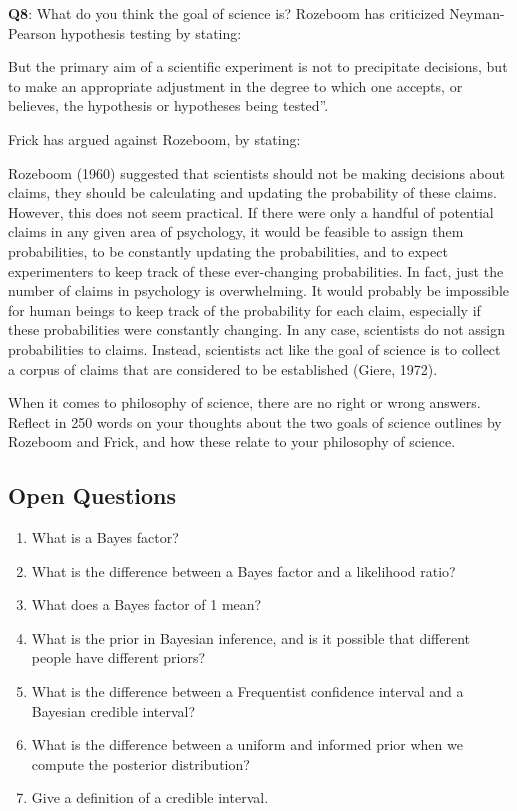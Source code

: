 \documentclass[
  oneside]{krantz}
\renewenvironment{quote}{\begin{VF}}{\end{VF}}
\begin{document}
\textbf{Q8}: What do you think the goal of science is? Rozeboom \citeyearpar{rozeboom_fallacy_1960} has criticized Neyman-Pearson hypothesis testing by stating:

\begin{quote}
But the primary aim of a scientific experiment is not to precipitate decisions, but to make an appropriate adjustment in the degree to which one accepts, or believes, the hypothesis or hypotheses being tested''.
\end{quote}

Frick \citeyearpar{frick_appropriate_1996} has argued against Rozeboom, by stating:

\begin{quote}
Rozeboom (1960) suggested that scientists should not be making decisions about claims, they should be calculating and updating the probability of these claims. However, this does not seem practical. If there were only a handful of potential claims in any given area of psychology, it would be feasible to assign them probabilities, to be constantly updating the probabilities, and to expect experimenters to keep track of these ever-changing probabilities. In fact, just the number of claims in psychology is overwhelming. It would probably be impossible for human beings to keep track of the probability for each claim, especially if these probabilities were constantly changing. In any case, scientists do not assign probabilities to claims. Instead, scientists act like the goal of science is to collect a corpus of claims that are considered to be established (Giere, 1972).
\end{quote}

When it comes to philosophy of science, there are no right or wrong answers. Reflect in 250 words on your thoughts about the two goals of science outlines by Rozeboom and Frick, and how these relate to your philosophy of science.

\hypertarget{open-questions-3}{%
\subsection{Open Questions}\label{open-questions-3}}

\begin{enumerate}
\def\labelenumi{\arabic{enumi}.}
\item
  What is a Bayes factor?
\item
  What is the difference between a Bayes factor and a likelihood ratio?
\item
  What does a Bayes factor of 1 mean?
\item
  What is the prior in Bayesian inference, and is it possible that different people have different priors?
\item
  What is the difference between a Frequentist confidence interval and a Bayesian credible interval?
\item
  What is the difference between a uniform and informed prior when we compute the posterior distribution?
\item
  Give a definition of a credible interval.
\end{enumerate}
\end{document}
